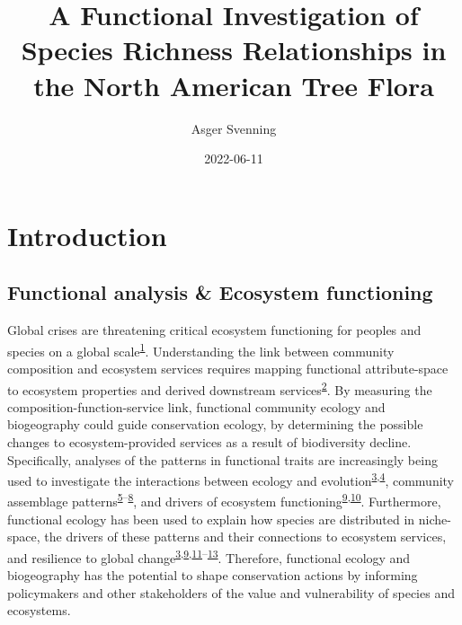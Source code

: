 \documentclass[
  10pt,
]{article}
\title{A Functional Investigation of Species Richness Relationships in the North American Tree Flora}
\author{Asger Svenning}
\date{2022-06-11}
\begin{document}
\maketitle

\renewcommand*\contentsname{Table of Contents}
{
\hypersetup{linkcolor=}
\setcounter{tocdepth}{2}
\tableofcontents
}
\newpage

\hypertarget{introduction}{%
\section{Introduction}\label{introduction}}

\hypertarget{functional-analysis-ecosystem-functioning}{%
\subsection{Functional analysis \& Ecosystem functioning}\label{functional-analysis-ecosystem-functioning}}

Global crises are threatening critical ecosystem functioning for peoples and species on a global scale\textsuperscript{\protect\hyperlink{ref-IPBES2019}{1}}. Understanding the link between community composition and ecosystem services requires mapping functional attribute-space to ecosystem properties and derived downstream services\textsuperscript{\protect\hyperlink{ref-Lavorel2002}{2}}. By measuring the composition-function-service link, functional community ecology and biogeography could guide conservation ecology, by determining the possible changes to ecosystem-provided services as a result of biodiversity decline. Specifically, analyses of the patterns in functional traits are increasingly being used to investigate the interactions between ecology and evolution\textsuperscript{\protect\hyperlink{ref-Storch2019}{3},\protect\hyperlink{ref-Rabosky2015}{4}}, community assemblage patterns\textsuperscript{\protect\hyperlink{ref-Ricklefs2012}{5}--\protect\hyperlink{ref-Ordonez2018}{8}}, and drivers of ecosystem functioning\textsuperscript{\protect\hyperlink{ref-McGill2006}{9},\protect\hyperlink{ref-Paine2015}{10}}. Furthermore, functional ecology has been used to explain how species are distributed in niche-space, the drivers of these patterns and their connections to ecosystem services, and resilience to global change\textsuperscript{\protect\hyperlink{ref-Storch2019}{3},\protect\hyperlink{ref-McGill2006}{9},\protect\hyperlink{ref-Villeger2008}{11}--\protect\hyperlink{ref-Violle2014}{13}}. Therefore, functional ecology and biogeography has the potential to shape conservation actions by informing policymakers and other stakeholders of the value and vulnerability of species and ecosystems.
\end{document}
